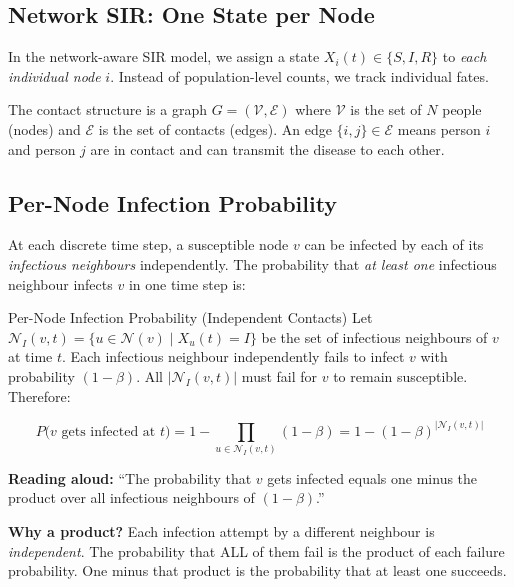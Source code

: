 \subsection{Network SIR: One State per Node}

In the network-aware SIR model, we assign a state $X_i(t) \in \{S, I, R\}$ to \emph{each individual node} $i$. Instead of population-level counts, we track individual fates.

The contact structure is a graph $G = (\mathcal{V}, \mathcal{E})$ where $\mathcal{V}$ is the set of $N$ people (nodes) and $\mathcal{E}$ is the set of contacts (edges). An edge $\{i,j\} \in \mathcal{E}$ means person $i$ and person $j$ are in contact and can transmit the disease to each other.

\subsection{Per-Node Infection Probability}

At each discrete time step, a susceptible node $v$ can be infected by each of its \emph{infectious neighbours} independently. The probability that \emph{at least one} infectious neighbour infects $v$ in one time step is:

\begin{mathbox}{Per-Node Infection Probability (Independent Contacts)}
Let $\mathcal{N}_I(v, t) = \{u \in \mathcal{N}(v) \mid X_u(t) = I\}$ be the set of infectious neighbours of $v$ at time $t$. Each infectious neighbour independently fails to infect $v$ with probability $(1 - \beta)$. All $|\mathcal{N}_I(v,t)|$ must fail for $v$ to remain susceptible. Therefore:

\begin{equation}
    P\bigl(v \text{ gets infected at } t\bigr) = 1 - \prod_{u \in \mathcal{N}_I(v,t)} (1 - \beta)
    = 1 - (1-\beta)^{|\mathcal{N}_I(v,t)|}
    \label{eq:network_infection}
\end{equation}

\textbf{Reading aloud:} ``The probability that $v$ gets infected equals one minus the product over all infectious neighbours of $(1 - \beta)$.''

\textbf{Why a product?} Each infection attempt by a different neighbour is \emph{independent}. The probability that ALL of them fail is the product of each failure probability. One minus that product is the probability that at least one succeeds.
\end{mathbox}


